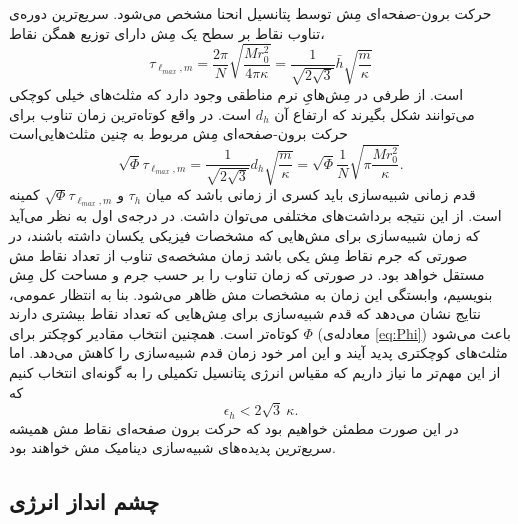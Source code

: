 حرکت برون-صفحه‌ای مِش توسط پتانسیل انحنا مشخص می‌شود. سریع‌ترین دوره‌ی تناوب نقاط بر سطح یک مِش دارای توزیع همگن نقاط، 
\begin{equation}
\tau_{\ell_{max},m}= \frac{2\pi}{N}\sqrt{\frac{Mr_0^2}{4\pi\kappa}}=\frac{1}{\sqrt{2\sqrt{3}}}\bar h\sqrt{\frac{m}{\kappa}}
\label{eq:tauL}
\end{equation}
است. از طرفی در مِش‌هایِ نرم مناطقی وجود دارد که مثلث‌های خیلی کوچکی می‌توانند شکل بگیرند که ارتفاع آن 
$d_h$
است. در واقع کوتاه‌ترین زمان تناوب برای حرکت برون-صفحه‌ای مِش مربوط به چنین مثلث‌هایی‌است
\begin{equation}
\sqrt{\Phi}\tau_{\ell_{max},m}=\frac{1}{\sqrt{2\sqrt{3}}}d_h\sqrt{\frac{m}{\kappa}}=\sqrt{\Phi}\frac{1}{N}\sqrt{\pi\frac{Mr_0^2}{\kappa}}.
\label{eq:tauLim}
\end{equation}
 قدم زمانی شبیه‌سازی باید کسری از  زمانی باشد که میان 
$\tau_h$
و
$\sqrt{\Phi}\tau_{\ell_{max},m}$
کمینه است. از این نتیجه برداشت‌های مختلفی می‌توان داشت. در درجه‌ی اول به نظر می‌آید که زمان شبیه‌سازی برای مش‌هایی که مشخصات فیزیکی یکسان داشته باشند، در صورتی که جرم نقاط مِش یکی باشد زمان مشخصه‌ی تناوب از تعداد نقاط مش مستقل خواهد بود. در صورتی که زمان تناوب را بر حسب جرم و مساحت کل مِش بنویسیم، وابستگی این زمان به مشخصات مش ظاهر می‌شود. بنا به انتظار عمومی، نتایج نشان می‌دهد که قدم شبیه‌سازی برای مِش‌هایی که تعداد نقاط بیشتری دارند کوتاه‌تر است. همچنین انتخاب مقادیر کوچکتر برای 
$\Phi$
(معادله‌ی 
\ref{eq:Phi})
باعث می‌شود مثلث‌های کوچکتری پدید آیند و این امر خود زمان قدم شبیه‌سازی را کاهش می‌دهد. اما از این مهم‌تر ما نیاز داریم که مقیاس انرژی پتانسیل تکمیلی را به گونه‌ای انتخاب کنیم که
\begin{equation}
\epsilon_h<2\sqrt{3}~\kappa.
\label{eq:EhKappa}
\end{equation}
در این صورت مطمئن خواهیم بود که حرکت برون صفحه‌ای نقاط مش همیشه سریع‌ترین پدید‌ه‌های شبیه‌سازی دینامیک مش خواهند بود.

\subsection{\label{sec:instabilities}
چشم انداز انرژی
}


